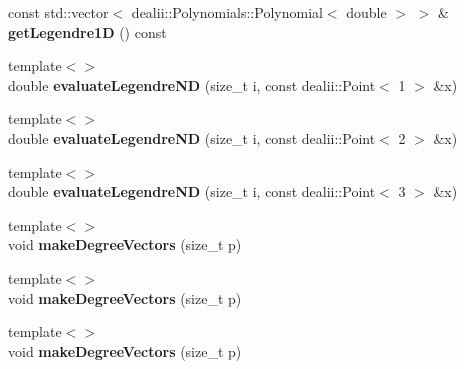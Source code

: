 \begin{DoxyCompactItemize}
\item 
\hypertarget{classnatrium_1_1NewFilter_a08cf711ca2c7671c5c35aa8045a0274e}{
const std::vector$<$ dealii::Polynomials::Polynomial$<$ double $>$ $>$ \& {\bfseries getLegendre1D} () const }
\label{classnatrium_1_1NewFilter_a08cf711ca2c7671c5c35aa8045a0274e}

\item 
\hypertarget{classnatrium_1_1NewFilter_acad32702d7d53cfe52961363043e3e34}{
{\footnotesize template$<$$>$ }\\double {\bfseries evaluateLegendreND} (size\_\-t i, const dealii::Point$<$ 1 $>$ \&x)}
\label{classnatrium_1_1NewFilter_acad32702d7d53cfe52961363043e3e34}

\item 
\hypertarget{classnatrium_1_1NewFilter_a1870dd3c571a62174c334421b83f7aa1}{
{\footnotesize template$<$$>$ }\\double {\bfseries evaluateLegendreND} (size\_\-t i, const dealii::Point$<$ 2 $>$ \&x)}
\label{classnatrium_1_1NewFilter_a1870dd3c571a62174c334421b83f7aa1}

\item 
\hypertarget{classnatrium_1_1NewFilter_a68443209e58c4fbe6b4a74d4391a16d7}{
{\footnotesize template$<$$>$ }\\double {\bfseries evaluateLegendreND} (size\_\-t i, const dealii::Point$<$ 3 $>$ \&x)}
\label{classnatrium_1_1NewFilter_a68443209e58c4fbe6b4a74d4391a16d7}

\item 
\hypertarget{classnatrium_1_1NewFilter_af0c7da64b0a485b526175021644ba520}{
{\footnotesize template$<$$>$ }\\void {\bfseries makeDegreeVectors} (size\_\-t p)}
\label{classnatrium_1_1NewFilter_af0c7da64b0a485b526175021644ba520}

\item 
\hypertarget{classnatrium_1_1NewFilter_ae325ca249a1732b87301ae9ff8ca1ccd}{
{\footnotesize template$<$$>$ }\\void {\bfseries makeDegreeVectors} (size\_\-t p)}
\label{classnatrium_1_1NewFilter_ae325ca249a1732b87301ae9ff8ca1ccd}

\item 
\hypertarget{classnatrium_1_1NewFilter_a0f91122ee3ebc5c3b089a4f0c3484990}{
{\footnotesize template$<$$>$ }\\void {\bfseries makeDegreeVectors} (size\_\-t p)}
\label{classnatrium_1_1NewFilter_a0f91122ee3ebc5c3b089a4f0c3484990}

\end{DoxyCompactItemize}
